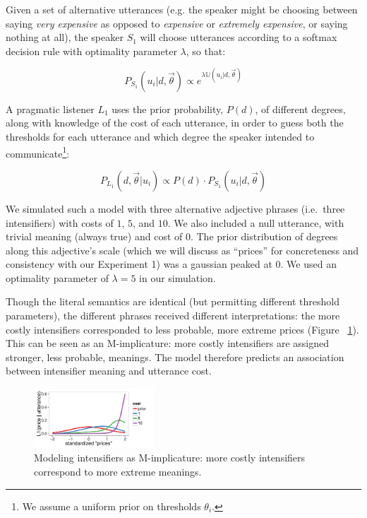 \documentclass[10pt,letterpaper]{article}
\newcommand{\w}[1]{\emph{#1}}
\begin{document}
Given a set of alternative utterances (e.g. the speaker might be choosing between saying \w{very expensive} as opposed to \w{expensive} or \w{extremely expensive}, or saying nothing at all), the speaker $S_1$ will choose utterances according to a softmax decision rule \cite{sutton} with optimality parameter $\lambda$, so that:

$$ P_{S_1}(u_i | d, \vec{\theta}) \propto e^{\lambda \mathbb{U}(u_i | d, \vec{\theta})} $$

A pragmatic listener $L_1$ uses the prior probability, $P(d)$, of different degrees, along with knowledge of the cost of each utterance, in order to guess both the thresholds for each utterance and which degree the speaker intended to communicate\footnote{We assume a uniform prior on thresholds $\theta_i$.}:

$$ P_{L_1}(d, \vec{\theta} | u_i) \propto P(d) \cdot P_{S_1}(u_i | d, \vec{\theta}) $$

We simulated such a model with three alternative adjective phrases (i.e.~three intensifiers) with costs of $1$, $5$, and $10$. We also included a null utterance, with trivial meaning (always true) and cost of $0$. The prior distribution of degrees along this adjective's scale (which we will discuss as ``prices'' for concreteness and consistency with our Experiment 1) was a gaussian peaked at $0$.
We used an optimality parameter of $\lambda=5$ in our simulation. 

Though the literal semantics are identical (but permitting different threshold parameters), the different phrases received different interpretations: the more costly intensifiers corresponded to less probable, more extreme prices (Figure ~\ref{model}). This can be seen as an M-implicature: more costly intensifiers are assigned stronger, less probable, meanings. 
The model therefore predicts an association between intensifier meaning and utterance cost.

\begin{figure}[tbh]
\begin{center}
\includegraphics[width=0.4\textwidth]{model_results.pdf}
\end{center}
\caption{Modeling intensifiers as M-implicature: more costly intensifiers correspond to more extreme meanings.} 
\label{model}
\end{figure}
\end{document}

